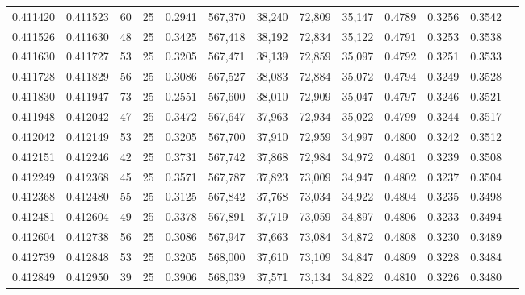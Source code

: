 \begin{tabular}{rrrrrrrrrrrrr}
0.411420 & 0.411523 &    60 &  25 &                                     0.2941 & 567,370 &  38,240 &  72,809 &  35,147 & 0.4789 & 0.3256 & 0.3542 \\
0.411526 & 0.411630 &    48 &  25 &                                     0.3425 & 567,418 &  38,192 &  72,834 &  35,122 & 0.4791 & 0.3253 & 0.3538 \\
0.411630 & 0.411727 &    53 &  25 &                                     0.3205 & 567,471 &  38,139 &  72,859 &  35,097 & 0.4792 & 0.3251 & 0.3533 \\
0.411728 & 0.411829 &    56 &  25 &                                     0.3086 & 567,527 &  38,083 &  72,884 &  35,072 & 0.4794 & 0.3249 & 0.3528 \\
0.411830 & 0.411947 &    73 &  25 &                                     0.2551 & 567,600 &  38,010 &  72,909 &  35,047 & 0.4797 & 0.3246 & 0.3521 \\
0.411948 & 0.412042 &    47 &  25 &                                     0.3472 & 567,647 &  37,963 &  72,934 &  35,022 & 0.4799 & 0.3244 & 0.3517 \\
0.412042 & 0.412149 &    53 &  25 &                                     0.3205 & 567,700 &  37,910 &  72,959 &  34,997 & 0.4800 & 0.3242 & 0.3512 \\
0.412151 & 0.412246 &    42 &  25 &                                     0.3731 & 567,742 &  37,868 &  72,984 &  34,972 & 0.4801 & 0.3239 & 0.3508 \\
0.412249 & 0.412368 &    45 &  25 &                                     0.3571 & 567,787 &  37,823 &  73,009 &  34,947 & 0.4802 & 0.3237 & 0.3504 \\
0.412368 & 0.412480 &    55 &  25 &                                     0.3125 & 567,842 &  37,768 &  73,034 &  34,922 & 0.4804 & 0.3235 & 0.3498 \\
0.412481 & 0.412604 &    49 &  25 &                                     0.3378 & 567,891 &  37,719 &  73,059 &  34,897 & 0.4806 & 0.3233 & 0.3494 \\
0.412604 & 0.412738 &    56 &  25 &                                     0.3086 & 567,947 &  37,663 &  73,084 &  34,872 & 0.4808 & 0.3230 & 0.3489 \\
0.412739 & 0.412848 &    53 &  25 &                                     0.3205 & 568,000 &  37,610 &  73,109 &  34,847 & 0.4809 & 0.3228 & 0.3484 \\
0.412849 & 0.412950 &    39 &  25 &                                     0.3906 & 568,039 &  37,571 &  73,134 &  34,822 & 0.4810 & 0.3226 & 0.3480 \\

\end{tabular}
